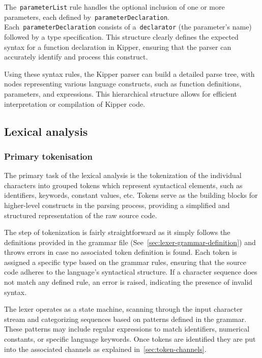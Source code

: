 The~\lstinline|parameterList| rule handles the optional inclusion of one or more parameters, each defined by~\lstinline|parameterDeclaration|. Each~\lstinline|parameterDeclaration| consists of a~\lstinline|declarator| (the parameter's name) followed by a type specification. This structure clearly defines the expected syntax for a function declaration in Kipper, ensuring that the parser can accurately identify and process this construct.

Using these syntax rules, the Kipper parser can build a detailed parse tree, with nodes representing various language constructs, such as function definitions, parameters, and expressions. This hierarchical structure allows for efficient interpretation or compilation of Kipper code.

\subsection{Lexical analysis}

\subsubsection{Primary tokenisation}

The primary task of the lexical analysis is the tokenization of the individual characters into grouped tokens which represent syntactical elements, such as identifiers, keywords, constant values, etc. Tokens serve as the building blocks for higher-level constructs in the parsing process, providing a simplified and structured representation of the raw source code.

The step of tokenization is fairly straightforward as it simply follows the definitions provided in the grammar file (See~\ref{sec:lexer-grammar-definition}) and throws errors in case no associated token definition is found. Each token is assigned a specific type based on the grammar rules, ensuring that the source code adheres to the language's syntactical structure. If a character sequence does not match any defined rule, an error is raised, indicating the presence of invalid syntax.

The lexer operates as a state machine, scanning through the input character stream and categorizing sequences based on patterns defined in the grammar. These patterns may include regular expressions to match identifiers, numerical constants, or specific language keywords. Once tokens are identified they are put into the associated channels as explained in~\ref{sec:token-channels}.

